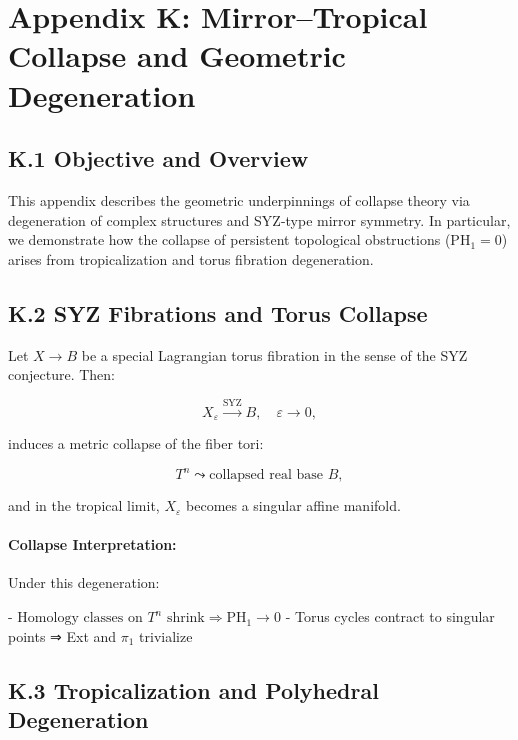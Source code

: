 \documentclass[11pt]{article}
\begin{document}
\appendix
\section*{Appendix K: Mirror–Tropical Collapse and Geometric Degeneration}

\subsection*{K.1 Objective and Overview}

This appendix describes the geometric underpinnings of collapse theory via degeneration of complex structures and SYZ-type mirror symmetry. In particular, we demonstrate how the collapse of persistent topological obstructions (\( \mathrm{PH}_1 = 0 \)) arises from tropicalization and torus fibration degeneration.

\subsection*{K.2 SYZ Fibrations and Torus Collapse}

Let \( X \to B \) be a special Lagrangian torus fibration in the sense of the SYZ conjecture. Then:

\[
X_\varepsilon \xrightarrow{\text{SYZ}} B,\quad \varepsilon \to 0,
\]

induces a metric collapse of the fiber tori:

\[
T^n \leadsto \text{collapsed real base } B,
\]

and in the tropical limit, \( X_\varepsilon \) becomes a singular affine manifold.

\paragraph{Collapse Interpretation:}  
Under this degeneration:

- \( \text{Homology classes on } T^n \text{ shrink} \Rightarrow \mathrm{PH}_1 \to 0 \)
- Torus cycles contract to singular points ⇒ Ext and \( \pi_1 \) trivialize

\subsection*{K.3 Tropicalization and Polyhedral Degeneration}
\end{document}
